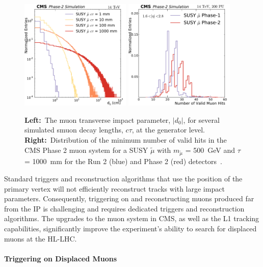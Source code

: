 \begin{figure}[t]\begin{center}
\includegraphics[width=0.47\textwidth]{figures/Stage0h1_0_d0_smuon_daughter}
\includegraphics[width=0.47\textwidth]{figures/MuonHitsEndcap}
\caption{
{\bf Left:}~The muon transverse impact parameter, $|d_{0}|$, for several simulated smuon decay lengths, $c\tau$, at the generator level.
{\bf Right:}~Distribution of the minimum number of valid hits in the CMS Phase 2 muon system for a SUSY $\widetilde{\mu}$ with $m_{\widetilde{\mu}}$ = 500~GeV and $\tau$ = 1000~mm for the Run 2 (blue) and Phase 2 (red) detectors~\cite{Lourenco:2283189}.
}
\label{fig:perfDisplaced}
\end{center}
\end{figure}

Standard triggers and reconstruction algorithms that use the position of the primary vertex will not efficiently reconstruct tracks with large impact parameters. Consequently, triggering on and reconstructing muons produced far  from the IP is challenging and requires dedicated triggers and reconstruction algorithms. The upgrades to the muon system in CMS, as well as the L1 tracking capabilities, significantly improve the experiment's ability to search for displaced muons at the HL-LHC.

\paragraph{Triggering on Displaced Muons}

